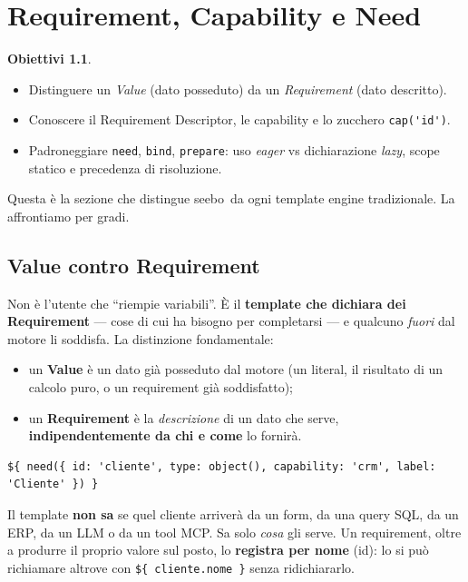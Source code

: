 \documentclass[11pt,a4paper]{book}
\let\code\lstinline
\newcommand{\ic}[1]{{\ttfamily #1}}
\theoremstyle{definition}
\newtheorem*{obiettivi}{Obiettivi}
\newcommand{\seebo}{\textsf{seebo}}
\begin{document}
{{{{\chapter{Requirement, Capability e Need}
\label{ch:requirement}

\begin{obiettivi}
\begin{itemize}
  \item Distinguere un \emph{Value} (dato posseduto) da un \emph{Requirement}
    (dato descritto).
  \item Conoscere il Requirement Descriptor, le capability e lo zucchero
    \code|cap('id')|.
  \item Padroneggiare \code|need|, \code|bind|, \code|prepare|: uso \emph{eager}
    vs dichiarazione \emph{lazy}, scope statico e precedenza di risoluzione.
\end{itemize}
\end{obiettivi}

Questa è la sezione che distingue \seebo\ da ogni template engine tradizionale.
La affrontiamo per gradi.

\section{Value contro Requirement}

Non è l'utente che ``riempie variabili''. È il \textbf{template che dichiara dei
Requirement} --- cose di cui ha bisogno per completarsi --- e qualcuno \emph{fuori}
dal motore li soddisfa. La distinzione fondamentale:

\begin{itemize}
  \item un \textbf{Value} è un dato già posseduto dal motore (un literal, il
    risultato di un calcolo puro, o un requirement già soddisfatto);
  \item un \textbf{Requirement} è la \emph{descrizione} di un dato che serve,
    \textbf{indipendentemente da chi e come} lo fornirà.
\end{itemize}

\begin{lstlisting}
${ need({ id: 'cliente', type: object(), capability: 'crm', label: 'Cliente' }) }
\end{lstlisting}

Il template \textbf{non sa} se quel \ic{cliente} arriverà da un form, da una query
SQL, da un ERP, da un LLM o da un tool MCP. Sa solo \emph{cosa} gli serve. Un
requirement, oltre a produrre il proprio valore sul posto, lo \textbf{registra per
nome} (\ic{id}): lo si può richiamare altrove con \code|${ cliente.nome }| senza
ridichiararlo.

}}}}
\end{document}
